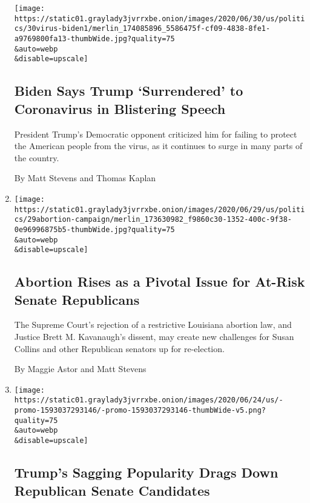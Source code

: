 \begin{enumerate}
  \texttt{[image: https://static01.graylady3jvrrxbe.onion/images/2020/06/30/us/politics/30virus-biden1/merlin\_174085896\_5586475f-cf09-4838-8fe1-a9769800fa13-thumbWide.jpg?quality=75\\\&auto=webp\\\&disable=upscale]}

  \hypertarget{biden-says-trump-surrendered-to-coronavirus-in-blistering-speech}{%
  \subsection{Biden Says Trump `Surrendered' to Coronavirus in
  Blistering
  Speech}\label{biden-says-trump-surrendered-to-coronavirus-in-blistering-speech}}

  President Trump's Democratic opponent criticized him for failing to
  protect the American people from the virus, as it continues to surge
  in many parts of the country.

  By Matt Stevens and Thomas Kaplan
\item
  \href{/2020/06/29/us/politics/2020-senate-abortion-susan-collins.html}{}

  \texttt{[image: https://static01.graylady3jvrrxbe.onion/images/2020/06/29/us/politics/29abortion-campaign/merlin\_173630982\_f9860c30-1352-400c-9f38-0e96996875b5-thumbWide.jpg?quality=75\\\&auto=webp\\\&disable=upscale]}

  \hypertarget{abortion-rises-as-a-pivotal-issue-for-at-risk-senate-republicans}{%
  \subsection{Abortion Rises as a Pivotal Issue for At-Risk Senate
  Republicans}\label{abortion-rises-as-a-pivotal-issue-for-at-risk-senate-republicans}}

  The Supreme Court's rejection of a restrictive Louisiana abortion law,
  and Justice Brett M. Kavanaugh's dissent, may create new challenges
  for Susan Collins and other Republican senators up for re-election.

  By Maggie Astor and Matt Stevens
\item
  \href{/2020/06/25/us/politics/trump-senate-republicans-poll.html}{}

  \texttt{[image: https://static01.graylady3jvrrxbe.onion/images/2020/06/24/us/-promo-1593037293146/-promo-1593037293146-thumbWide-v5.png?quality=75\\\&auto=webp\\\&disable=upscale]}

  \hypertarget{trumps-sagging-popularity-drags-down-republican-senate-candidates}{%
  \subsection{Trump's Sagging Popularity Drags Down Republican Senate
  Candidates}\label{trumps-sagging-popularity-drags-down-republican-senate-candidates}}


\end{enumerate}
